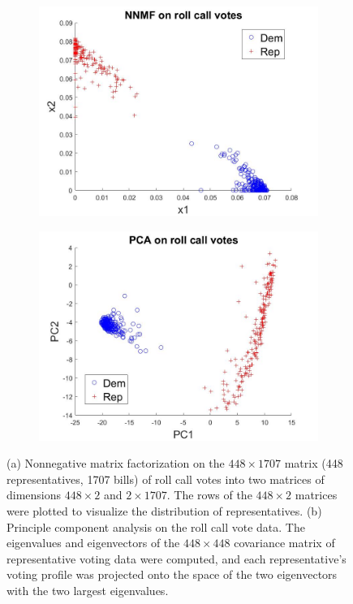 \documentclass{article}
\begin{document}
\begin{figure}[h]
  \centering
    \begin{subfigure}[b]{0.4\textwidth}
        \includegraphics[width=\textwidth]{NNMF_votes.jpg}
        \caption{}
        \label{fig:NNMF}
    \end{subfigure}
          \begin{subfigure}[b]{0.4\textwidth}
        \includegraphics[width=\textwidth]{PCA_votes}
        \caption{}
        \label{fig:PCA}
    \end{subfigure}
  \caption{(a) Nonnegative matrix factorization on the $448\times 1707$ matrix (448 representatives, 1707 bills) of roll call votes into two matrices of dimensions $448\times 2$ and $2\times 1707$. The rows of the $448\times 2$ matrices were plotted to visualize the distribution of representatives. (b) Principle component analysis on the roll call vote data. The eigenvalues and eigenvectors of the $448\times 448$ covariance matrix of representative voting data were computed, and each representative's voting profile was projected onto the space of the two eigenvectors with the two largest eigenvalues.}
\end{figure}
\end{document}
